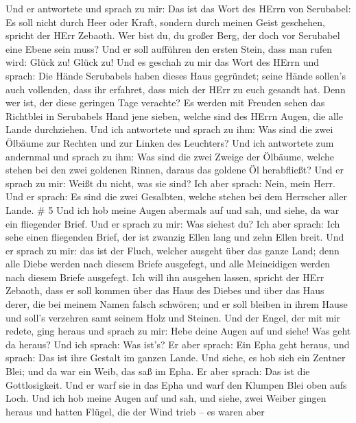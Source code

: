  Und er antwortete und sprach zu mir: Das ist das Wort des
HErrn von Serubabel: Es soll nicht durch Heer oder Kraft, sondern durch
meinen Geist geschehen, spricht der HErr Zebaoth.  Wer bist
du, du großer Berg, der doch vor Serubabel eine Ebene sein muss? Und er
soll aufführen den ersten Stein, dass man rufen wird: Glück zu! Glück
zu!  Und es geschah zu mir das Wort des HErrn und sprach:
 Die Hände Serubabels haben dieses Haus gegründet; seine
Hände sollen's auch vollenden, dass ihr erfahret, dass mich der HErr zu
euch gesandt hat.  Denn wer ist, der diese geringen Tage
verachte? Es werden mit Freuden sehen das Richtblei in Serubabels Hand
jene sieben, welche sind des HErrn Augen, die alle Lande durchziehen.
 Und ich antwortete und sprach zu ihm: Was sind die zwei
Ölbäume zur Rechten und zur Linken des Leuchters?  Und ich
antwortete zum andernmal und sprach zu ihm: Was sind die zwei Zweige der
Ölbäume, welche stehen bei den zwei goldenen Rinnen, daraus das goldene
Öl herabfließt?  Und er sprach zu mir: Weißt du nicht, was
sie sind? Ich aber sprach: Nein, mein Herr.  Und er sprach:
Es sind die zwei Gesalbten, welche stehen bei dem Herrscher aller Lande.
\# 5  Und ich hob meine Augen abermals auf und sah, und
siehe, da war ein fliegender Brief.  Und er sprach zu mir:
Was siehest du? Ich aber sprach: Ich sehe einen fliegenden Brief, der
ist zwanzig Ellen lang und zehn Ellen breit.  Und er sprach
zu mir: das ist der Fluch, welcher ausgeht über das ganze Land; denn
alle Diebe werden nach diesem Briefe ausgefegt, und alle Meineidigen
werden nach diesem Briefe ausgefegt.  Ich will ihn ausgehen
lassen, spricht der HErr Zebaoth, dass er soll kommen über das Haus des
Diebes und über das Haus derer, die bei meinem Namen falsch schwören;
und er soll bleiben in ihrem Hause und soll's verzehren samt seinem Holz
und Steinen.  Und der Engel, der mit mir redete, ging heraus
und sprach zu mir: Hebe deine Augen auf und siehe! Was geht da heraus?
 Und ich sprach: Was ist's? Er aber sprach: Ein Epha geht
heraus, und sprach: Das ist ihre Gestalt im ganzen Lande. 
Und siehe, es hob sich ein Zentner Blei; und da war ein Weib, das saß im
Epha.  Er aber sprach: Das ist die Gottlosigkeit. Und er
warf sie in das Epha und warf den Klumpen Blei oben aufs Loch.
 Und ich hob meine Augen auf und sah, und siehe, zwei Weiber
gingen heraus und hatten Flügel, die der Wind trieb -- es waren aber
